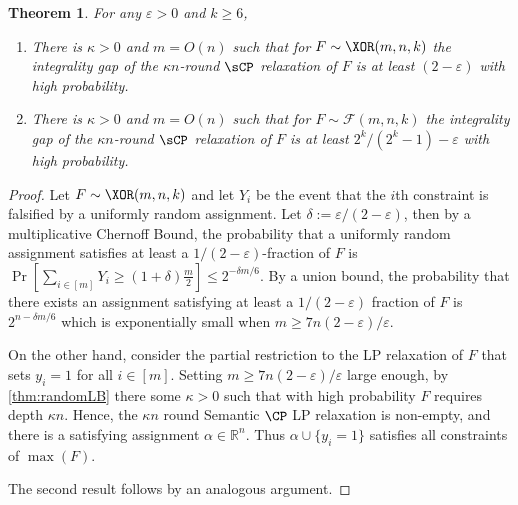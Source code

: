 \documentclass[11pt]{article}
\newtheorem{theorem}{Theorem}[section]
\begin{document}
\begin{theorem}
	For any $\varepsilon >0$ and $k \geq 6$,
	\begin{enumerate}
		\item[$1$.] There is $\kappa>0$ and $m = O(n)$ such that for $F \sim \XOR(m,n,k)$ the integrality gap of the $\kappa n$-round  $\sCP$ relaxation of $F$ is at least $(2-\varepsilon)$ with high probability. 
		\item[$2$.] There is $\kappa >0$ and $m=O(n)$ such that for $F \sim \mathcal{F}(m,n,k)$ the integrality gap of the $\kappa n$-round $\sCP$ relaxation of $F$ is at least $2^k/(2^k-1) - \varepsilon$ with high probability.
	\end{enumerate}
\end{theorem}
\begin{proof}
	Let $F \sim \XOR(m,n,k)$ and let $Y_i$ be the event that the $i$th constraint is falsified by a uniformly random assignment. Let $\delta:=\varepsilon/(2-\varepsilon)$, then by a multiplicative Chernoff Bound, the probability that a uniformly random assignment satisfies at least a $1/(2-\varepsilon)$-fraction of $F$ is 
	$ \Pr [\sum_{i \in [m]}Y_i \geq (1+\delta)\frac{m}{2} ] \leq 2^{-\delta m/6}$.
	By a union bound, the probability that there exists an assignment satisfying at least a $1/(2-\varepsilon)$ fraction of $F$ is $2^{n-\delta m/6}$ which is exponentially small when $m \geq 7n(2-\varepsilon)/\varepsilon$.
	
	On the other hand, consider the partial restriction to the LP relaxation of $F$ that sets $y_i=1$ for all $i \in [m]$.
	Setting $m \geq 7n(2-\varepsilon)/\varepsilon$ large enough, by \autoref{thm:randomLB} there some $\kappa > 0$ such that with high probability $F$ requires depth $\kappa n$. 
	Hence, the $\kappa n$ round Semantic $\CP$ LP relaxation is non-empty, and there is a satisfying assignment $\alpha \in \mathbb{R}^n$. Thus $\alpha \cup \{y_i=1\}$ satisfies all constraints of $\max(F)$.
	
	The second result follows by an analogous argument.
\end{proof}




%


%
\end{document}
